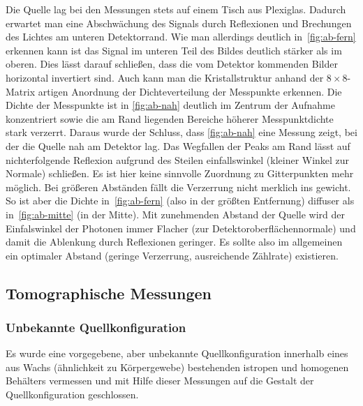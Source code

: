 \documentclass[slug=PET, room=Andreas-Schubert-Bau\,\ 424A, supervisor=Carsten\ Bittrich, coursedate=10.\ 01.\ 2020]{../../Lab_Report_LaTeX/lab_report}
\begin{document}
Die Quelle lag bei den Messungen stets auf einem Tisch aus
Plexiglas. Dadurch erwartet man eine Abschwächung des Signals durch
Reflexionen und Brechungen des Lichtes am unteren Detektorrand.  Wie
man allerdings deutlich in~\ref{fig:ab-fern} erkennen kann ist das
Signal im unteren Teil des Bildes deutlich stärker als im oberen. Dies
lässt darauf schließen, dass die vom Detektor kommenden Bilder
horizontal invertiert sind.  Auch kann man die Kristallstruktur anhand
der \(8\times 8\)-Matrix artigen Anordnung der Dichteverteilung der
Messpunkte erkennen.  Die Dichte der Messpunkte ist in
\ref{fig:ab-nah} deutlich im Zentrum der Aufnahme konzentriert sowie
die am Rand liegenden Bereiche höherer Messpunktdichte stark
verzerrt. Daraus wurde der Schluss, dass \ref{fig:ab-nah} eine Messung
zeigt, bei der die Quelle nah am Detektor lag. Das Wegfallen der Peaks
am Rand l\"asst auf nichterfolgende Reflexion aufgrund des Steilen
einfallswinkel (kleiner Winkel zur Normale) schließen. Es ist hier
keine sinnvolle Zuordnung zu Gitterpunkten mehr m\"oglich.  Bei
gr\"o\ss{}eren Abst\"anden f\"allt die Verzerrung nicht merklich ins
gewicht. So ist aber die Dichte in~\ref{fig:ab-fern} (also in der
gr\"o\ss{}ten Entfernung) diffuser als in~\ref{fig:ab-mitte} (in der
Mitte). Mit zunehmenden Abstand der Quelle wird der Einfalswinkel der
Photonen immer Flacher (zur Detektoroberfl\"achennormale) und damit
die Ablenkung durch Reflexionen geringer. Es sollte also im
allgemeinen ein optimaler Abstand (geringe Verzerrung, ausreichende
Z\"ahlrate) existieren.


\subsection{Tomographische Messungen}
\label{sec:tom}

\subsubsection{Unbekannte Quellkonfiguration}
\label{sec:tom1}

Es wurde eine vorgegebene, aber unbekannte Quellkonfiguration
innerhalb eines aus Wachs (\"ahnlichkeit zu K\"orpergewebe)
bestehenden istropen und homogenen Beh\"alters vermessen und mit Hilfe
dieser Messungen auf die Gestalt der Quellkonfiguration geschlossen.
\end{document}
